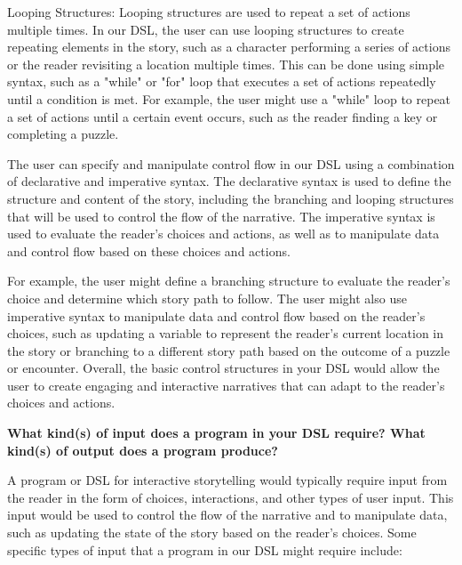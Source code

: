 Looping Structures: Looping structures are used to repeat a set of actions multiple times. In our DSL, the user can use looping structures to create repeating elements in the story, such as a character performing a series of actions or the reader revisiting a location multiple times. This can be done using simple syntax, such as a "while" or "for" loop that executes a set of actions repeatedly until a condition is met. For example, the user might use a "while" loop to repeat a set of actions until a certain event occurs, such as the reader finding a key or completing a puzzle.

The user can specify and manipulate control flow in our DSL using a combination of declarative and imperative syntax. The declarative syntax is used to define the structure and content of the story, including the branching and looping structures that will be used to control the flow of the narrative. The imperative syntax is used to evaluate the reader's choices and actions, as well as to manipulate data and control flow based on these choices and actions.

For example, the user might define a branching structure to evaluate the reader's choice and determine which story path to follow. The user might also use imperative syntax to manipulate data and control flow based on the reader's choices, such as updating a variable to represent the reader's current location in the story or branching to a different story path based on the outcome of a puzzle or encounter. Overall, the basic control structures in your DSL would allow the user to create engaging and interactive narratives that can adapt to the reader's choices and actions.

\textbf {What kind(s) of input does a program in your DSL require? What kind(s) of output does a program produce?}

A program or DSL for interactive storytelling would typically require input from the reader in the form of choices, interactions, and other types of user input. This input would be used to control the flow of the narrative and to manipulate data, such as updating the state of the story based on the reader's choices.
Some specific types of input that a program in our DSL might require include:

